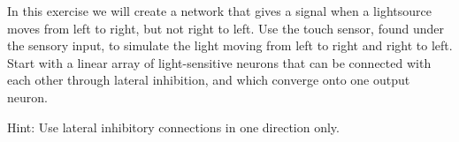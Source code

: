 \begin{Exercise}[title=Directional lightsource]
In this exercise we will create a network that gives a signal when a lightsource moves from left to right, but not right to left.
Use the touch sensor, found under the sensory input, to simulate the light moving from left to right and right to left. Start with a linear array of light-sensitive neurons that can be connected with each other through lateral inhibition, and which converge onto one output neuron. 



Hint: Use lateral inhibitory connections in one direction only.
\end{Exercise}
